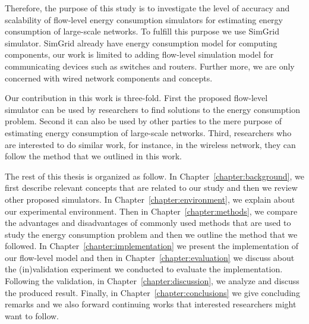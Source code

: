 Therefore, the purpose of this study is to investigate the level of accuracy and scalability of flow-level energy consumption simulators for estimating energy consumption of large-scale networks. To fulfill this purpose we use SimGrid simulator. SimGrid already have energy consumption model for computing components, our work is limited to adding flow-level simulation model for communicating devices such as switches and routers. Further more, we are only concerned with wired network components and concepts. 

Our contribution in this work is three-fold. First the proposed flow-level simulator can be used by researchers to find solutions to the energy consumption problem. Second it can also be used by other parties to the mere purpose of estimating energy consumption of large-scale networks. Third, researchers who are interested to do similar work, for instance, in the wireless network, they can follow the method that we outlined in this work.  

The rest of this thesis is organized as follow. In Chapter~\ref{chapter:background}, we first describe relevant concepts that are related to our study and then we review other proposed simulators. In Chapter~\ref{chapter:environment}, we explain about our experimental environment. Then in Chapter~\ref{chapter:methods}, we compare the advantages and disadvantages of commonly used methods that are used to study the energy consumption problem and then we outline the method that we followed. In Chapter~\ref{chapter:implementation} we present the implementation of our flow-level model and then in Chapter~\ref{chapter:evaluation} we discuss about the (in)validation experiment we conducted to evaluate the implementation. Following the validation, in Chapter~\ref{chapter:discussion}, we analyze and discuss the produced result. Finally, in Chapter~\ref{chapter:conclusions} we give concluding remarks and we also forward continuing works that interested researchers might want to follow.


